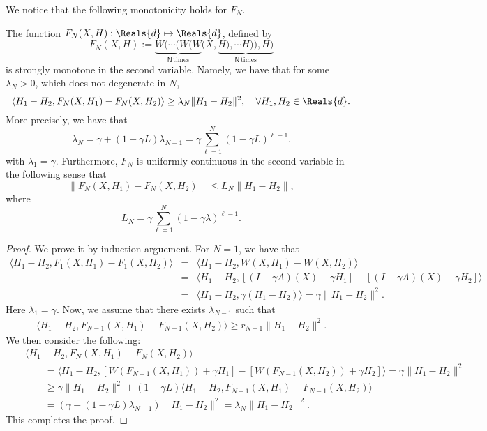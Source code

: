 We notice that the following monotonicity holds for $F_N$. 
\begin{lemma}
The function $F_N(X,H) : \Reals{d} \mapsto \Reals{d}$, defined by 
\begin{equation}
F_N(X,H) := \underbrace{W(\cdots (W(W}_{\textsf{N} \, \mbox{times}}(X, \underbrace{H), \cdots H)),H)}_{\textsf{N}\, \mbox{times}}
\end{equation}
is strongly monotone in the second variable. Namely, we have that for some $\lambda_N > 0$, which does not degenerate in $N$,  
\begin{equation}
\langle H_1 - H_2, F_N(X,H_1) - F_N(X,H_2) \rangle \geq \lambda_N \|H_1 - H_2\|^2, \quad \forall H_1, H_2 \in \Reals{d}.
\end{equation}
More precisely, we have that 
\begin{equation} 
\lambda_N = \gamma + (1 - \gamma L) \lambda_{N-1} = \gamma \sum_{\ell=1}^N (1 - \gamma L)^{\ell-1}.  
\end{equation} 
with $\lambda_1 = \gamma$. Furthermore, $F_N$ is uniformly continuous in the second variable in the following sense that
\begin{equation}
\|F_N(X,H_1) - F_N(X,H_2)\| \leq L_{N} \|H_1 - H_2\|,  
\end{equation}
where 
\begin{equation} 
L_{N} = \gamma \sum_{\ell = 1}^{N} (1 - \gamma \lambda)^{\ell-1}. 
\end{equation} 
\end{lemma}
\begin{proof}
We prove it by induction arguement. For $N = 1$, we have that 
\begin{eqnarray*}
\langle H_1 - H_2, F_1(X,H_1) - F_1(X,H_2) \rangle &=& \langle H_1 - H_2, W(X,H_1) - W(X,H_2) \rangle \\ 
&=& \langle H_1 - H_2, [(I - \gamma A)(X)  + \gamma H_1] - [(I - \gamma A)(X) + \gamma H_2] \rangle \\
&=& \langle H_1 - H_2, \gamma (H_1 - H_2) \rangle = \gamma \|H_1 - H_2\|^2. 
\end{eqnarray*}
Here $\lambda_1 = \gamma$. Now, we assume that there exists $\lambda_{N-1}$ such that 
\begin{eqnarray*}
\langle H_1 - H_2, F_{N-1}(X,H_1) - F_{N-1}(X,H_2) \rangle \geq r_{N-1} \|H_1 - H_2\|^2. 
\end{eqnarray*}
We then consider the following: 
\begin{eqnarray*}
&& \langle H_1 - H_2, F_N(X,H_1) - F_N(X,H_2) \rangle \\
&& \qquad = \langle H_1 - H_2, [W(F_{N-1}(X,H_1)) + \gamma H_1] - [W(F_{N-1}(X,H_2)) + \gamma H_2] \rangle = \gamma \|H_1 - H_2\|^2 \\
&& \qquad \geq \gamma \|H_1 - H_2\|^2 + (1 - \gamma L ) \langle H_1 - H_2, F_{N-1}(X,H_1) - F_{N-1}(X,H_2) \rangle \\
&& \qquad = (\gamma + (1 - \gamma L) \lambda_{N-1}) \|H_1 - H_2\|^2 = \lambda_N \|H_1 - H_2\|^2. 
\end{eqnarray*}
This completes the proof. 
\end{proof}


